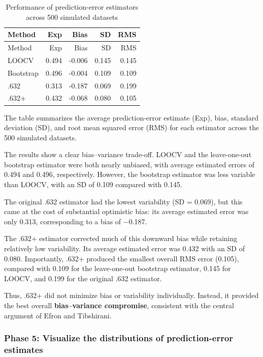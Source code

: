 \documentclass[
  letterpaper,
  DIV=11,
  numbers=noendperiod]{scrreprt}
\begin{document}
\begin{longtable}[]{@{}lrrrr@{}}
\caption{Performance of prediction-error estimators across 500 simulated
datasets}\tabularnewline
\toprule\noalign{}
Method & Exp & Bias & SD & RMS \\
\midrule\noalign{}
\endfirsthead
\toprule\noalign{}
Method & Exp & Bias & SD & RMS \\
\midrule\noalign{}
\endhead
\bottomrule\noalign{}
\endlastfoot
LOOCV & 0.494 & -0.006 & 0.145 & 0.145 \\
Bootstrap & 0.496 & -0.004 & 0.109 & 0.109 \\
.632 & 0.313 & -0.187 & 0.069 & 0.199 \\
.632+ & 0.432 & -0.068 & 0.080 & 0.105 \\
\end{longtable}

The table summarizes the average prediction-error estimate (Exp), bias,
standard deviation (SD), and root mean squared error (RMS) for each
estimator across the 500 simulated datasets.

The results show a clear bias--variance trade-off. LOOCV and the
leave-one-out bootstrap estimator were both nearly unbiased, with
average estimated errors of 0.494 and 0.496, respectively. However, the
bootstrap estimator was less variable than LOOCV, with an SD of 0.109
compared with 0.145.

The original .632 estimator had the lowest variability (SD = 0.069), but
this came at the cost of substantial optimistic bias: its average
estimated error was only 0.313, corresponding to a bias of −0.187.

The .632+ estimator corrected much of this downward bias while retaining
relatively low variability. Its average estimated error was 0.432 with
an SD of 0.080. Importantly, .632+ produced the smallest overall RMS
error (0.105), compared with 0.109 for the leave-one-out bootstrap
estimator, 0.145 for LOOCV, and 0.199 for the original .632 estimator.

Thus, .632+ did not minimize bias or variability individually. Instead,
it provided the best overall \textbf{bias--variance compromise},
consistent with the central argument of Efron and Tibshirani.

\subsubsection{Phase 5: Visualize the distributions of prediction-error
estimates}\label{phase-5-visualize-the-distributions-of-prediction-error-estimates}
\end{document}
